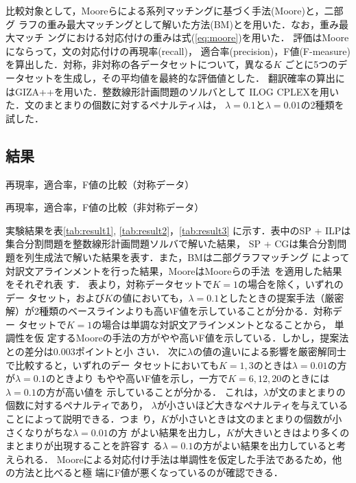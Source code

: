 \documentclass[japanese]{jnlp_1.4}
\begin{document}
比較対象として，Mooreらによる系列マッチングに基づく手法(Moore)と，二部グ
ラフの重み最大マッチングとして解いた方法(BM)とを用いた．なお，重み最大マッチ
ングにおける対応付けの重みは式(\ref{eq:moore})を用いた．
評価はMoore\cite{moore02:_fast}にならって，文の対応付けの再現率(recall)，
適合率(precision)，F値(F-measure)を算出した．対称，非対称の各データセットについて，異なる$K$
ごとに5つのデータセットを生成し，その平均値を最終的な評価値とした．
翻訳確率の算出にはGIZA++\cite{och03}を用いた．整数線形計画問題のソルバとして
ILOG CPLEXを用いた．文のまとまりの個数に対するペナルティ$\lambda$は，
$\lambda = 0.1$と$\lambda = 0.01$の2種類を試した．


\subsection{結果}

\begin{table}[b]
\caption{再現率，適合率，F値の比較（対称データ）}
\label{tab:result1}

\end{table}
\begin{table}[b]
\caption{再現率，適合率，F値の比較（非対称データ）}
\label{tab:result2}

\end{table}

実験結果を表\ref{tab:result1}, \ref{tab:result2}，\ref{tab:result3} に示す．表中のSP + ILPは
集合分割問題を整数線形計画問題ソルバで解いた結果，
SP + CGは集合分割問題を列生成法で解いた結果を表す．また，BMは二部グラフマッチング
によって対訳文アラインメントを行った結果，MooreはMooreらの手法~\cite{moore02:_fast}を適用した結果をそれぞれ表
す．
表より，対称データセットで$K=1$の場合を除く，いずれのデー
タセット，および$K$の値においても，$\lambda = 0.1$としたときの提案手法（厳密
解）が2種類のベースラインよりも高いF値を示していることが分かる．対称デー
タセットで$K=1$の場合は単調な対訳文アラインメントとなることから， 単調性を仮
定するMooreの手法の方がやや高いF値を示している．しかし，提案法との差分は0.003ポイントと小
さい．
次に$\lambda$の値の違いによる影響を厳密解同士で比較すると，いずれのデー
タセットにおいても$K=1, 3$のときは$\lambda = 0.01$の方が$\lambda = 0.1$のときより
もやや高いF値を示し，一方で$K=6, 12, 20$のときには$\lambda = 0.1$の方が高い値を
示していることが分かる．
これは，$\lambda$が文のまとまりの個数に対するペナルティであり，
$\lambda$が小さいほど大きなペナルティを与えていることによって説明できる．つま
り，$K$が小さいときは文のまとまりの個数が小さくなりがちな$\lambda = 0.01$の方
がよい結果を出力し，$K$が大きいときはより多くのまとまりが出現することを許容す
る$\lambda = 0.1$の方がよい結果を出力していると考えられる．
Mooreによる対応付け手法は単調性を仮定した手法であるため，他の方法と比べると極
端にF値が悪くなっているのが確認できる．
\end{document}
